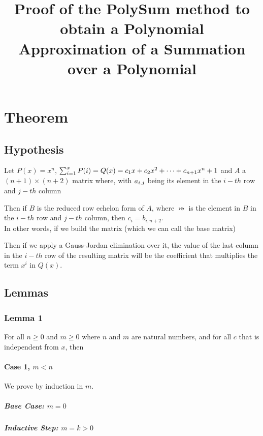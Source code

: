 \documentclass[a4paper, 10pt]{article}
\title{Proof of the PolySum method to obtain a Polynomial Approximation of a Summation over a Polynomial}
\begin{document}
\allowdisplaybreaks
\maketitle

\section{Theorem}
\subsection{Hypothesis}

Let $P(x) = x^n$, $\sum_{i=1}^{x}P(i) = Q(x) = c_1x + c_2x^2 + \cdots + c_{n+1}x^n+1$ and $A$ a $(n+1) \times (n+2)$ matrix where, with $a_{i,j}$ being its element in the $i-th$ row and $j-th$ column

\aijDef

Then if $B$ is the reduced row echelon form of $A$, where $\bij$ is the element in $B$ in the $i-th$ row  and $j-th$ column, then $c_i = b_{i,n+2}$.\\

In other words, if we build the matrix (which we can call the base matrix)

\AMatrix

Then if we apply a Gauss-Jordan elimination over it, the value of the last column in the $i-th$ row of the resulting matrix will be the coefficient that multiplies the term $x^i$ in $Q(x)$.

\subsection{Lemmas}
\subsubsection{Lemma 1}

For all $n \geq 0$ and $m \geq 0$ where $n$ and $m$ are natural numbers, and for all $c$ that is independent from $x$, then
\lemmaOne

\paragraph{Case 1, $m < n$}

We prove by induction in $m$.

\subparagraph{Base Case: $m = 0$}

\lemmaOneCaseOneBase

\subparagraph{Inductive Step: $m = k > 0$}
\end{document}
